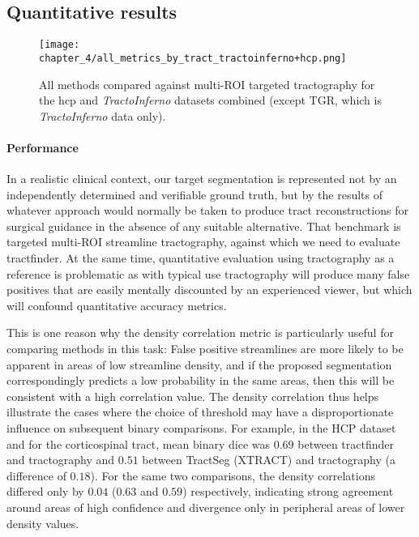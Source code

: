 \subsection{Quantitative results}

\begin{figure}[h!]
  \centering
  \texttt{[image: chapter\_4/all\_metrics\_by\_tract\_tractoinferno+hcp.png]}
  \caption{All methods compared against multi-ROI targeted tractography for the \gls{hcp} and \textit{TractoInferno} datasets combined (except TGR, which is \textit{TractoInferno} data only). }
  \label{fig:combobox}
\end{figure}

\paragraph*{Performance}

In a realistic clinical context, our target segmentation is represented not by an independently determined and verifiable ground truth, but by the results of whatever approach would normally be taken to produce tract reconstructions for surgical guidance in the absence of any suitable alternative.
That benchmark is targeted multi-ROI streamline tractography, against which we need to evaluate tractfinder.
At the same time, quantitative evaluation using tractography as a reference is problematic as with typical use tractography will produce many false positives that are easily mentally discounted by an experienced viewer, but which will confound quantitative accuracy metrics.


This is one reason why the density correlation metric is particularly useful for comparing methods in this task:
False positive streamlines are more likely to be apparent in areas of low streamline density, and if the proposed segmentation correspondingly predicts a low probability in the same areas, then this will be consistent with a high correlation value.
The density correlation thus helps illustrate the cases where the choice of threshold may have a disproportionate influence on subsequent binary comparisons.
For example, in the HCP dataset and for the corticospinal tract, mean binary \gls{dice} was $0.69$ between tractfinder and tractography and $0.51$ between TractSeg (XTRACT) and tractography (a difference of $0.18$).
For the same two comparisons, the density correlations differed only by $0.04$ ($0.63$ and $0.59$) respectively, indicating strong agreement around areas of high confidence and divergence only in peripheral areas of lower density values.



